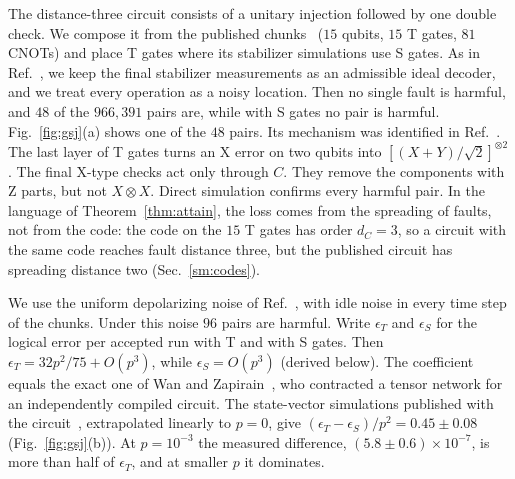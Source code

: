 \documentclass[aps,prl,reprint,twocolumn,amsmath,amssymb,floatfix,nofootinbib,superscriptaddress]{revtex4-2}
\theoremstyle{definition}
\theoremstyle{remark}
\begin{document}
The distance-three circuit consists of a unitary injection followed by one double check. We compose it from the published chunks~\cite{gsjcode} ($15$ qubits, $15$ T gates, $81$ CNOTs) and place T gates where its stabilizer simulations use S gates. As in Ref.~\cite{cultivation}, we keep the final stabilizer measurements as an admissible ideal decoder, and we treat every operation as a noisy location. Then no single fault is harmful, and $48$ of the $966{,}391$ pairs are, while with S gates no pair is harmful. Fig.~\ref{fig:gsj}(a) shows one of the $48$ pairs. Its mechanism was identified in Ref.~\cite{chan}. The last layer of T gates turns an X error on two qubits into $[(X+Y)/\sqrt2]^{\otimes2}$. The final X-type checks act only through $C$. They remove the components with Z parts, but not $X\otimes X$. Direct simulation confirms every harmful pair. In the language of Theorem~\ref{thm:attain}, the loss comes from the spreading of faults, not from the code: the code on the $15$ T gates has order $d_C=3$, so a circuit with the same code reaches fault distance three, but the published circuit has spreading distance two (Sec.~\ref{sm:codes}).

We use the uniform depolarizing noise of Ref.~\cite{cultivation}, with idle noise in every time step of the chunks. Under this noise $96$ pairs are harmful. Write $\epsilon_T$ and $\epsilon_S$ for the logical error per accepted run with T and with S gates. Then $\epsilon_T=32p^2/75+O(p^3)$, while $\epsilon_S=O(p^3)$ (derived below). The coefficient equals the exact one of Wan and Zapirain~\cite{wanzapirain}, who contracted a tensor network for an independently compiled circuit. The state-vector simulations published with the circuit~\cite{gsjcode}, extrapolated linearly to $p=0$, give $(\epsilon_T-\epsilon_S)/p^2=0.45\pm0.08$ (Fig.~\ref{fig:gsj}(b)). At $p=10^{-3}$ the measured difference, $(5.8\pm0.6)\times10^{-7}$, is more than half of $\epsilon_T$, and at smaller $p$ it dominates.
\end{document}
